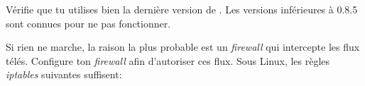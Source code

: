 Vérifie que tu utilises bien la derni\`ere version de . Les versions inférieures à 0.8.5 sont connues pour ne pas fonctionner.

Si rien ne marche, la raison la plus probable est un \emph{firewall} qui intercepte les flux télés. Configure ton \emph{firewall} afin d'autoriser
ces flux. Sous Linux, les r\`egles \emph{iptables} suivantes suffisent:

